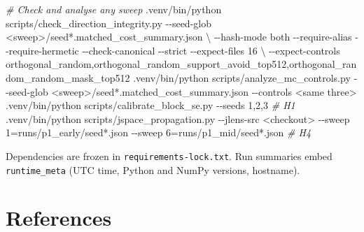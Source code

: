\documentclass[
  10pt,
]{article}
\newenvironment{Shaded}{}{}
\newcommand{\AttributeTok}[1]{\textcolor[rgb]{0.49,0.56,0.16}{#1}}
\newcommand{\CommentTok}[1]{\textcolor[rgb]{0.38,0.63,0.69}{\textit{#1}}}
\newcommand{\DataTypeTok}[1]{\textcolor[rgb]{0.56,0.13,0.00}{#1}}
\newcommand{\ExtensionTok}[1]{#1}
\newcommand{\NormalTok}[1]{#1}
\newcommand{\OperatorTok}[1]{\textcolor[rgb]{0.40,0.40,0.40}{#1}}
\newcommand{\StringTok}[1]{\textcolor[rgb]{0.25,0.44,0.63}{#1}}
\begin{document}
\begin{Shaded}
\begin{Highlighting}[]
\CommentTok{\# Check and analyse any sweep}
\ExtensionTok{.venv/bin/python}\NormalTok{ scripts/check\_direction\_integrity.py }\AttributeTok{{-}{-}seed{-}glob} \StringTok{\textquotesingle{}\textless{}sweep\textgreater{}/seed*.matched\_cost\_summary.json\textquotesingle{}} \DataTypeTok{\textbackslash{}}
  \AttributeTok{{-}{-}hash{-}mode}\NormalTok{ both }\AttributeTok{{-}{-}require{-}alias} \AttributeTok{{-}{-}require{-}hermetic} \AttributeTok{{-}{-}check{-}canonical} \AttributeTok{{-}{-}strict} \AttributeTok{{-}{-}expect{-}files}\NormalTok{ 16 }\DataTypeTok{\textbackslash{}}
  \AttributeTok{{-}{-}expect{-}controls}\NormalTok{ orthogonal\_random,orthogonal\_random\_support\_avoid\_top512,orthogonal\_random\_random\_mask\_top512}
\ExtensionTok{.venv/bin/python}\NormalTok{ scripts/analyze\_mc\_controls.py }\AttributeTok{{-}{-}seed{-}glob} \StringTok{\textquotesingle{}\textless{}sweep\textgreater{}/seed*.matched\_cost\_summary.json\textquotesingle{}} \AttributeTok{{-}{-}controls} \OperatorTok{\textless{}}\NormalTok{same three}\OperatorTok{\textgreater{}}
\ExtensionTok{.venv/bin/python}\NormalTok{ scripts/calibrate\_block\_se.py }\AttributeTok{{-}{-}seeds}\NormalTok{ 1,2,3        }\CommentTok{\# H1}
\ExtensionTok{.venv/bin/python}\NormalTok{ scripts/jspace\_propagation.py }\AttributeTok{{-}{-}jlens{-}src} \OperatorTok{\textless{}}\NormalTok{checkout}\OperatorTok{\textgreater{}}\NormalTok{ {-}{-}sweep }\StringTok{\textquotesingle{}1=runs/p1\_early/seed*.json\textquotesingle{}} \AttributeTok{{-}{-}sweep} \StringTok{\textquotesingle{}6=runs/p1\_mid/seed*.json\textquotesingle{}}   \CommentTok{\# H4}
\end{Highlighting}
\end{Shaded}

Dependencies are frozen in \texttt{requirements-lock.txt}. Run summaries
embed \texttt{runtime\_meta} (UTC time, Python and NumPy versions,
hostname).

\section*{References}\label{references}
\end{document}
